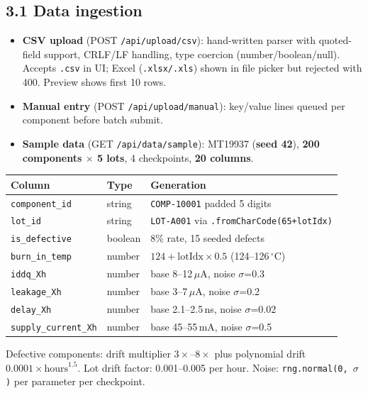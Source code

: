 \documentclass[11pt,a4paper]{article}
\newcommand{\code}[1]{\texttt{\small #1}}
\begin{document}
\subsection*{3.1 Data ingestion}
\begin{itemize}[leftmargin=1.5em]
  \item \textbf{CSV upload} (POST \code{/api/upload/csv}): hand-written parser with quoted-field
        support, CRLF/LF handling, type coercion (number/boolean/null). Accepts \code{.csv} in UI;
        Excel (\code{.xlsx/.xls}) shown in file picker but rejected with 400. Preview shows first
        10 rows.
  \item \textbf{Manual entry} (POST \code{/api/upload/manual}): key/value lines queued per
        component before batch submit.
  \item \textbf{Sample data} (GET \code{/api/data/sample}): MT19937 (\textbf{seed 42}),
        \textbf{200 components $\times$ 5 lots}, 4 checkpoints, \textbf{20 columns}.
\end{itemize}

\begin{center}
\begin{tabular}{@{}lll@{}}
\toprule
\textbf{Column} & \textbf{Type} & \textbf{Generation}\\
\midrule
\code{component\_id} & string & \code{COMP-10001} padded 5 digits\\
\code{lot\_id} & string & \code{LOT-A001} via \code{.fromCharCode(65+lotIdx)}\\
\code{is\_defective} & boolean & 8\% rate, 15 seeded defects\\
\code{burn\_in\_temp} & number & $124 + \text{lotIdx}\times 0.5$ (124--126\,$^{\circ}$C)\\
\code{iddq\_Xh} & number & base 8--12\,$\mu$A, noise $\sigma$=0.3\\
\code{leakage\_Xh} & number & base 3--7\,$\mu$A, noise $\sigma$=0.2\\
\code{delay\_Xh} & number & base 2.1--2.5\,ns, noise $\sigma$=0.02\\
\code{supply\_current\_Xh} & number & base 45--55\,mA, noise $\sigma$=0.5\\
\bottomrule
\end{tabular}
\end{center}

\noindent Defective components: drift multiplier $3\times$--$8\times$ plus polynomial drift
$0.0001\times \text{hours}^{1.5}$. Lot drift factor: 0.001--0.005 per hour. Noise:
\code{rng.normal(0, $\sigma$)} per parameter per checkpoint.
\end{document}
